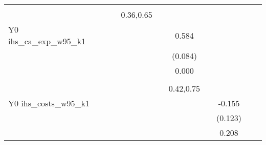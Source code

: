 \begin{table}[!h]
\begin{adjustbox}{width=\columnwidth,center}
\begin{tabular}{l*{8}{c}}
                    &                     &                     &                     &                     &                     &                     &                     &                     &                     &                     \\
                    &                     &                     &   0.36,0.65         &                     &                     &                     &                     &                     &                     &                     \\
Y0 ihs\_ca\_exp\_w95\_k1&                     &                     &                     &                     &       0.584\sym{***}&                     &                     &                     &                     &                     \\
                    &                     &                     &                     &                     &     (0.084)         &                     &                     &                     &                     &                     \\
                    &                     &                     &                     &                     &       0.000         &                     &                     &                     &                     &                     \\
                    &                     &                     &                     &                     &                     &                     &                     &                     &                     &                     \\
                    &                     &                     &                     &                     &   0.42,0.75         &                     &                     &                     &                     &                     \\
Y0 ihs\_costs\_w95\_k1 &                     &                     &                     &                     &                     &                     &      -0.155         &                     &                     &                     \\
                    &                     &                     &                     &                     &                     &                     &     (0.123)         &                     &                     &                     \\
                    &                     &                     &                     &                     &                     &                     &       0.208         &                     &                     &                     \\

\end{tabular}
\end{adjustbox}
\end{table}
